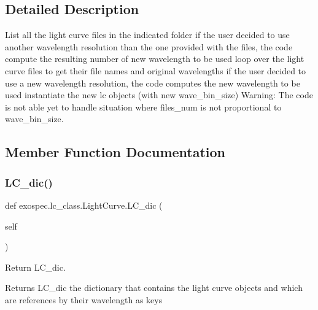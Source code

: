 \subsection{Detailed Description}
List all the light curve files in the indicated folder if the user decided to use another wavelength resolution than the one provided with the files, the code compute the resulting number of new wavelength to be used loop over the light curve files to get their file names and original wavelengths if the user decided to use a new wavelength resolution, the code computes the new wavelength to be used instantiate the new lc objects (with new wave\+\_\+bin\+\_\+size) Warning\+: The code is not able yet to handle situation where files\+\_\+num is not proportional to wave\+\_\+bin\+\_\+size. 

\subsection{Member Function Documentation}
\mbox{\label{classexospec_1_1lc__class_1_1_light_curve_aa0feb2d525e844a5f010939b3a8e9ae9}} 
\subsubsection{\texorpdfstring{L\+C\+\_\+dic()}{LC\_dic()}}
{\footnotesize\ttfamily def exospec.\+lc\+\_\+class.\+Light\+Curve.\+L\+C\+\_\+dic (\begin{DoxyParamCaption}\item[{}]{self }\end{DoxyParamCaption})}



Return L\+C\+\_\+dic. 

\begin{DoxyReturn}{Returns}
L\+C\+\_\+dic the dictionary that contains the light curve objects and which are references by their wavelength as keys 
\end{DoxyReturn}
\mbox{\label{classexospec_1_1lc__class_1_1_light_curve_a8af62f3180b7d965c9d02ad92b1f0089}} 

